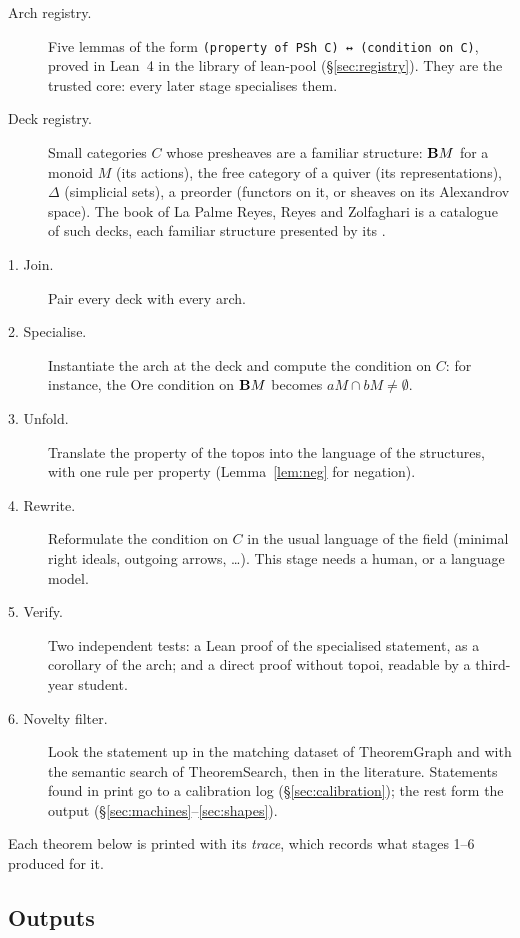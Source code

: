 \begin{description}
\item[Arch registry.] Five lemmas of the form \texttt{(property of PSh C) ↔ (condition on C)}, proved in Lean~4 in the library \lp{} of lean-pool (\S\ref{sec:registry}). They are the trusted core: every later stage specialises them.
\item[Deck registry.] Small categories $C$ whose presheaves are a familiar structure: $\mathbf{B} M$ for a monoid $M$ (its actions), the free category of a quiver (its representations), $\Delta$ (simplicial sets), a preorder (functors on it, or sheaves on its Alexandrov space). The book of La Palme Reyes, Reyes and Zolfaghari \cite{reyes-generic} is a catalogue of such decks, each familiar structure presented by its .
\item[1. Join.] Pair every deck with every arch.
\item[2. Specialise.] Instantiate the arch at the deck and compute the condition on $C$: for instance, the Ore condition on $\mathbf{B} M$ becomes $aM\cap bM\neq\emptyset$.
\item[3. Unfold.] Translate the property of the topos into the language of the structures, with one rule per property (Lemma~\ref{lem:neg} for negation).
\item[4. Rewrite.] Reformulate the condition on $C$ in the usual language of the field (minimal right ideals, outgoing arrows, \dots). This stage needs a human, or a language model.
\item[5. Verify.] Two independent tests: a Lean proof of the specialised statement, as a corollary of the arch; and a direct proof without topoi, readable by a third-year student.
\item[6. Novelty filter.] Look the statement up in the matching dataset of TheoremGraph and with the semantic search of TheoremSearch, then in the literature. Statements found in print go to a calibration log (\S\ref{sec:calibration}); the rest form the output (\S\ref{sec:machines}--\ref{sec:shapes}).
\end{description}

Each theorem below is printed with its \emph{trace}, which records what stages 1--6 produced for it.

\subsection{Outputs}

